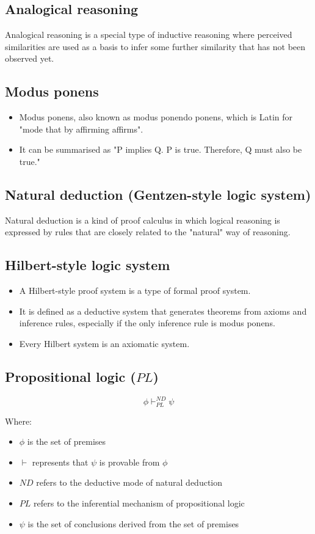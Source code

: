 \documentclass[11pt]{article}
\begin{document}
\subsection{Analogical reasoning}
\label{sec:org5cb33c1}
Analogical reasoning is a special type of inductive reasoning where perceived similarities are used as a basis to infer some further similarity that has not been observed yet.
\subsection{Modus ponens}
\label{sec:orgf2b3217}
\begin{itemize}
\item Modus ponens, also known as modus ponendo ponens, which is Latin for "mode that by affirming affirms".
\item It can be summarised as "P implies Q. P is true. Therefore, Q must also be true."
\end{itemize}
\subsection{Natural deduction (Gentzen-style logic system)}
\label{sec:org1ebde38}
Natural deduction is a kind of proof calculus in which logical reasoning is expressed by rules that are closely related to the "natural" way of reasoning.
\subsection{Hilbert-style logic system}
\label{sec:org8e28ff1}
\begin{itemize}
\item A Hilbert-style proof system is a type of formal proof system.
\item It is defined as a deductive system that generates theorems from axioms and inference rules, especially if the only inference rule is modus ponens.
\item Every Hilbert system is an axiomatic system.
\end{itemize}
\subsection{Propositional logic (\(PL\))}
\label{sec:org9453ef3}
\[\phi \vdash^{ND}_{PL} \psi\]

Where:
\begin{itemize}
\item \(\phi\) is the set of premises
\item \(\vdash\) represents that \(\psi\) is provable from \(\phi\)
\item \(ND\) refers to the deductive mode of natural deduction
\item \(PL\) refers to the inferential mechanism of propositional logic
\item \(\psi\) is the set of conclusions derived from the set of premises
\end{itemize}
\end{document}
